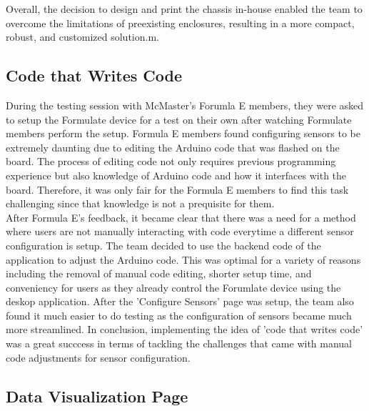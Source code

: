 \documentclass[12pt]{article}
\begin{document}
Overall, the decision to design and print the chassis in-house enabled the team to overcome the limitations of preexisting enclosures, resulting in a more compact, robust, and customized solution.m.

\subsection{Code that Writes Code}
During the testing session with McMaster's Forumla E members, they were asked to setup the Formulate device for a test on their own after watching Formulate
members perform the setup. Formula E members found configuring sensors to be extremely daunting due to editing the Arduino code that was flashed on the board.
The process of editing code not only requires previous programming experience but also knowledge of Arduino code and how it interfaces with the board. Therefore,
it was only fair for the Formula E members to find this task challenging since that knowledge is not a prequisite for them. \\

After Formula E's feedback, it became clear that there was a need for a method where users are not manually interacting with code everytime a different sensor 
configuration is setup. The team decided to use the backend code of the application to adjust the Arduino code. This was optimal for a variety of reasons including
the removal of manual code editing, shorter setup time, and conveniency for users as they already control the Forumlate device using the deskop application. After the
'Configure Sensors' page was setup, the team also found it much easier to do testing as the configuration of sensors became much more streamlined. In conclusion,
implementing the idea of 'code that writes code' was a great succcess in terms of tackling the challenges that came with manual code adjustments for sensor configuration.

\subsection{Data Visualization Page}
\end{document}
